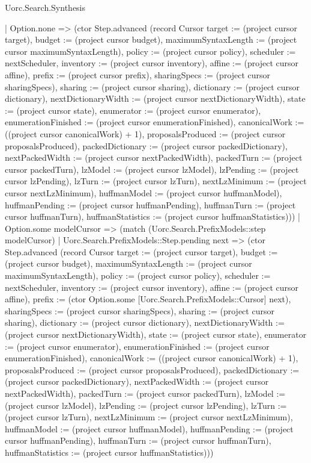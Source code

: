 \begin{lexlean}{Uorc.Search.Synthesis}
\begin{semanticmodule}
{        | Option.none => (ctor Step.advanced (record Cursor {target := (project cursor target), budget := (project cursor budget), maximumSyntaxLength := (project cursor maximumSyntaxLength), policy := (project cursor policy), scheduler := nextScheduler, inventory := (project cursor inventory), affine := (project cursor affine), prefix := (project cursor prefix), sharingSpecs := (project cursor sharingSpecs), sharing := (project cursor sharing), dictionary := (project cursor dictionary), nextDictionaryWidth := (project cursor nextDictionaryWidth), state := (project cursor state), enumerator := (project cursor enumerator), enumerationFinished := (project cursor enumerationFinished), canonicalWork := ((project cursor canonicalWork) + 1), proposalsProduced := (project cursor proposalsProduced), packedDictionary := (project cursor packedDictionary), nextPackedWidth := (project cursor nextPackedWidth), packedTurn := (project cursor packedTurn), lzModel := (project cursor lzModel), lzPending := (project cursor lzPending), lzTurn := (project cursor lzTurn), nextLzMinimum := (project cursor nextLzMinimum), huffmanModel := (project cursor huffmanModel), huffmanPending := (project cursor huffmanPending), huffmanTurn := (project cursor huffmanTurn), huffmanStatistics := (project cursor huffmanStatistics)}))
        | Option.some modelCursor => (match (Uorc.Search.PrefixModels::step modelCursor)
          | Uorc.Search.PrefixModels::Step.pending next => (ctor Step.advanced (record Cursor {target := (project cursor target), budget := (project cursor budget), maximumSyntaxLength := (project cursor maximumSyntaxLength), policy := (project cursor policy), scheduler := nextScheduler, inventory := (project cursor inventory), affine := (project cursor affine), prefix := (ctor Option.some [Uorc.Search.PrefixModels::Cursor] next), sharingSpecs := (project cursor sharingSpecs), sharing := (project cursor sharing), dictionary := (project cursor dictionary), nextDictionaryWidth := (project cursor nextDictionaryWidth), state := (project cursor state), enumerator := (project cursor enumerator), enumerationFinished := (project cursor enumerationFinished), canonicalWork := ((project cursor canonicalWork) + 1), proposalsProduced := (project cursor proposalsProduced), packedDictionary := (project cursor packedDictionary), nextPackedWidth := (project cursor nextPackedWidth), packedTurn := (project cursor packedTurn), lzModel := (project cursor lzModel), lzPending := (project cursor lzPending), lzTurn := (project cursor lzTurn), nextLzMinimum := (project cursor nextLzMinimum), huffmanModel := (project cursor huffmanModel), huffmanPending := (project cursor huffmanPending), huffmanTurn := (project cursor huffmanTurn), huffmanStatistics := (project cursor huffmanStatistics)}))
}
\end{semanticmodule}
\end{lexlean}
